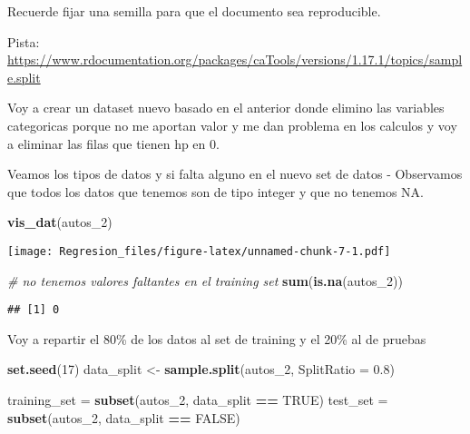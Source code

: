 \documentclass[]{article}
\newenvironment{Shaded}{\begin{snugshade}}{\end{snugshade}}
\newcommand{\CommentTok}[1]{\textcolor[rgb]{0.56,0.35,0.01}{\textit{#1}}}
\newcommand{\DataTypeTok}[1]{\textcolor[rgb]{0.13,0.29,0.53}{#1}}
\newcommand{\DecValTok}[1]{\textcolor[rgb]{0.00,0.00,0.81}{#1}}
\newcommand{\FloatTok}[1]{\textcolor[rgb]{0.00,0.00,0.81}{#1}}
\newcommand{\KeywordTok}[1]{\textcolor[rgb]{0.13,0.29,0.53}{\textbf{#1}}}
\newcommand{\NormalTok}[1]{#1}
\newcommand{\OperatorTok}[1]{\textcolor[rgb]{0.81,0.36,0.00}{\textbf{#1}}}
\newcommand{\OtherTok}[1]{\textcolor[rgb]{0.56,0.35,0.01}{#1}}
\newcommand{\StringTok}[1]{\textcolor[rgb]{0.31,0.60,0.02}{#1}}
\begin{document}
Recuerde fijar una semilla para que el documento sea reproducible.

Pista:
\url{https://www.rdocumentation.org/packages/caTools/versions/1.17.1/topics/sample.split}

Voy a crear un dataset nuevo basado en el anterior donde elimino las
variables categoricas porque no me aportan valor y me dan problema en
los calculos y voy a eliminar las filas que tienen hp en 0.

\begin{Shaded}
\end{Shaded}

Veamos los tipos de datos y si falta alguno en el nuevo set de datos -
Observamos que todos los datos que tenemos son de tipo integer y que no
tenemos NA.

\begin{Shaded}
\begin{Highlighting}[]
\KeywordTok{vis_dat}\NormalTok{(autos_}\DecValTok{2}\NormalTok{)}
\end{Highlighting}
\end{Shaded}

\texttt{[image: Regresion\_files/figure-latex/unnamed-chunk-7-1.pdf]}

\begin{Shaded}
\begin{Highlighting}[]
\CommentTok{# no tenemos valores faltantes en el training set}
\KeywordTok{sum}\NormalTok{(}\KeywordTok{is.na}\NormalTok{(autos_}\DecValTok{2}\NormalTok{))}
\end{Highlighting}
\end{Shaded}

\begin{verbatim}
## [1] 0
\end{verbatim}

Voy a repartir el 80\% de los datos al set de training y el 20\% al de
pruebas

\begin{Shaded}
\begin{Highlighting}[]
\KeywordTok{set.seed}\NormalTok{(}\DecValTok{17}\NormalTok{)}
\NormalTok{data_split <-}\StringTok{ }\KeywordTok{sample.split}\NormalTok{(autos_}\DecValTok{2}\NormalTok{, }\DataTypeTok{SplitRatio =} \FloatTok{0.8}\NormalTok{)}

\NormalTok{training_set =}\StringTok{ }\KeywordTok{subset}\NormalTok{(autos_}\DecValTok{2}\NormalTok{, data_split }\OperatorTok{==}\StringTok{ }\OtherTok{TRUE}\NormalTok{)}
\NormalTok{test_set  =}\StringTok{ }\KeywordTok{subset}\NormalTok{(autos_}\DecValTok{2}\NormalTok{, data_split }\OperatorTok{==}\StringTok{ }\OtherTok{FALSE}\NormalTok{)}
\end{Highlighting}
\end{Shaded}
\end{document}
